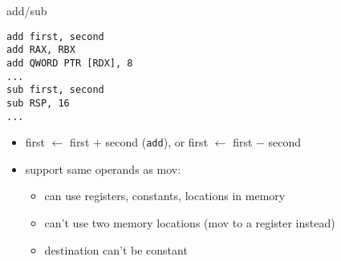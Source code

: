 \begin{frame}[fragile,label=addSub]{add/sub}
\begin{lstlisting}
add first, second
add RAX, RBX
add QWORD PTR [RDX], 8
...
sub first, second
sub RSP, 16
...
\end{lstlisting}
\begin{itemize}
\item first $\leftarrow$ first $+$ second (\texttt{add}), or first $\leftarrow$ first $-$ second
\item support same operands as mov:
    \begin{itemize}
    \item can use registers, constants, locations in memory
    \item can't use two memory locations (mov to a register instead)
    \item destination can't be constant
    \end{itemize}
\end{itemize}
\end{frame}
